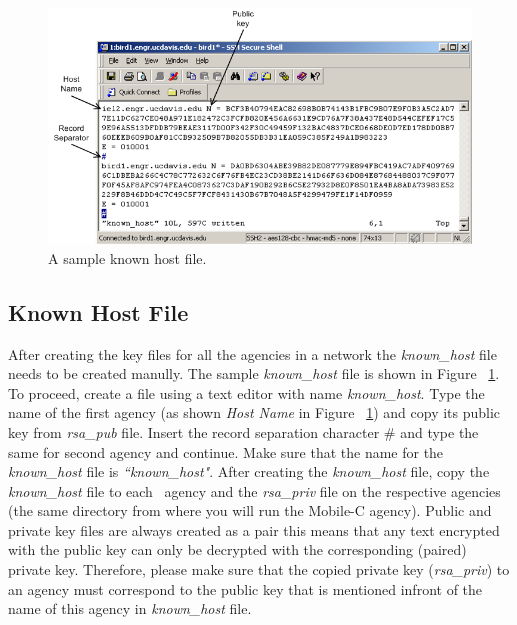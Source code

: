 \documentclass[11pt]{report}
\begin{document}
\begin{figure}[!t]
\begin{center}
   \includegraphics[scale=0.5]{figure/knownhost}
   \caption{A sample known host file.}
   \label{fig:knownhost}
\end{center}
\end{figure}

\subsection{Known Host File}
After creating the key files for all the agencies in a network the 
  \textit{known\_host} file needs to be created manully.
The sample \textit{known\_host} file is shown in Figure ~\ref{fig:knownhost}. 
To proceed, create a file using a text editor with name 
  \textit{known\_host}. 
Type the name of the first agency (as shown \textit{Host Name} in 
Figure ~\ref{fig:knownhost}) and 
copy its public key from \textit{rsa\_pub} file. Insert the record 
separation character \# and type the same for second agency and continue.
Make sure that the name for the \textit{known\_host} file is 
\textit{``known\_host"}. After creating the 
\textit{known\_host} file, copy the \textit{known\_host} file to each \
agency and the \textit{rsa\_priv} file on the respective
agencies (the same directory from where you will run the Mobile-C 
agency). 
Public and private key files are always created as a pair this means that
  any text encrypted with the public key can only be decrypted with the
  corresponding (paired) private key.
Therefore, please make sure that the copied private key 
(\textit{rsa\_priv}) to an agency must correspond to the public key
that is mentioned infront of the name of this agency in \textit{
known\_host} file.
\end{document}
